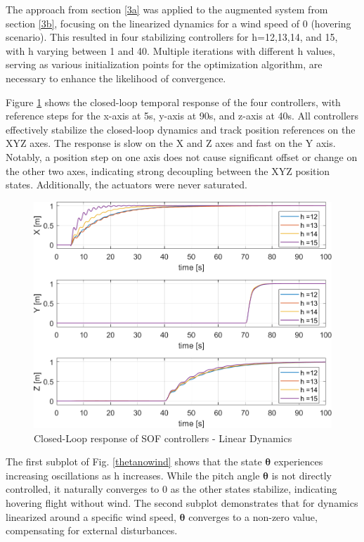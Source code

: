 The approach from section  \ref{3a} was applied to the augmented system from section \ref{3b}, focusing on the linearized dynamics for a wind speed of 0 (hovering scenario). This resulted in four stabilizing controllers for h=12,13,14, and 15, with h varying between 1 and 40. Multiple iterations with different h values, serving as various initialization points for the optimization algorithm, are necessary to enhance the likelihood of convergence.

Figure \ref{HKStepRes_a} shows the closed-loop temporal response of the four controllers, with reference steps for the x-axis at 5s, y-axis at 90s, and z-axis at 40s. All controllers effectively stabilize the closed-loop dynamics and track position references on the XYZ axes. The response is slow on the X and Z axes and fast on the Y axis. Notably, a position step on one axis does not cause significant offset or change on the other two axes, indicating strong decoupling between the XYZ position states. Additionally, the actuators were never saturated.

\begin{figure}[hbt]
    \centering
   \includegraphics[width=0.9\columnwidth]{figures/stepResponse.png}
    \vspace{-0.3cm}\caption{Closed-Loop response of SOF controllers - Linear Dynamics}
    \label{HKStepRes_a}
\end{figure}

The first subplot of Fig. \ref{thetanowind} shows that the state $\pmb{\theta}$ experiences increasing oscillations as h increases. While the pitch angle $\pmb{\theta}$ is not directly controlled, it naturally converges to 0 as the other states stabilize, indicating hovering flight without wind. The second subplot demonstrates that for dynamics linearized around a specific wind speed, $\pmb{\theta}$ converges to a non-zero value, compensating for external disturbances.

